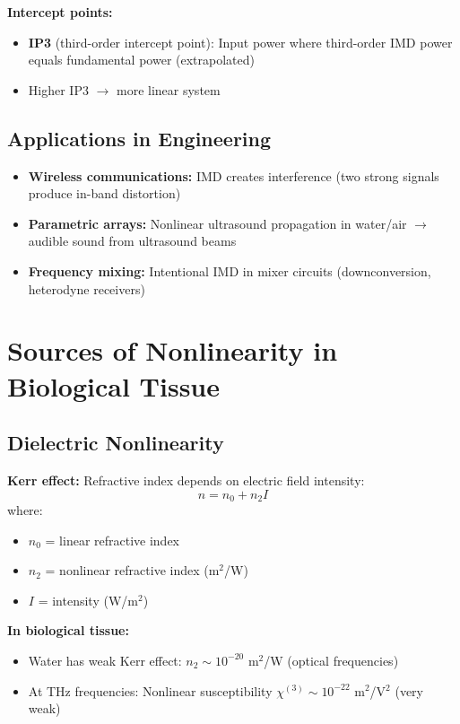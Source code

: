 \textbf{Intercept points:}
\begin{itemize}
\item \textbf{IP3} (third-order intercept point): Input power where third-order IMD power equals fundamental power (extrapolated)
\item Higher IP3 $\rightarrow$ more linear system
\end{itemize}

\subsection{Applications in Engineering}

\begin{itemize}
\item \textbf{Wireless communications:} IMD creates interference (two strong signals produce in-band distortion)
\item \textbf{Parametric arrays:} Nonlinear ultrasound propagation in water/air $\rightarrow$ audible sound from ultrasound beams
\item \textbf{Frequency mixing:} Intentional IMD in mixer circuits (downconversion, heterodyne receivers)
\end{itemize}

\section{Sources of Nonlinearity in Biological Tissue}

\subsection{Dielectric Nonlinearity}

\textbf{Kerr effect:} Refractive index depends on electric field intensity:
\begin{equation}
\label{eq:kerr-effect}
n = n_0 + n_2 I
\end{equation}
where:
\begin{itemize}
\item $n_0$ = linear refractive index
\item $n_2$ = nonlinear refractive index (m$^2$/W)
\item $I$ = intensity (W/m$^2$)
\end{itemize}

\textbf{In biological tissue:}
\begin{itemize}
\item Water has weak Kerr effect: $n_2 \sim 10^{-20}$ m$^2$/W (optical frequencies)
\item At THz frequencies: Nonlinear susceptibility $\chi^{(3)} \sim 10^{-22}$ m$^2$/V$^2$ (very weak)
\end{itemize}

